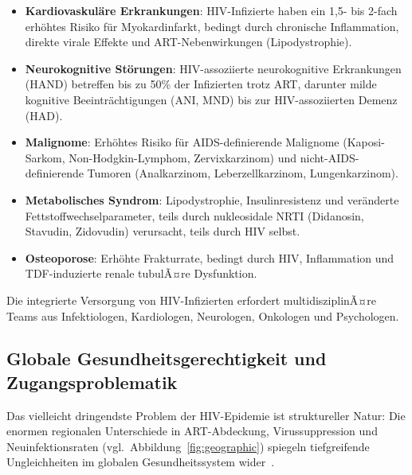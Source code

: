 ﻿\documentclass[a4paper,12pt]{article}
\theoremstyle{definition}
\begin{document}
\begin{itemize}
\item \textbf{Kardiovaskul\"are Erkrankungen}: HIV-Infizierte haben ein 1{,}5- bis
      2-fach erh\"ohtes Risiko f\"ur Myokardinfarkt, bedingt durch chronische
      Inflammation, direkte virale Effekte und ART-Nebenwirkungen (Lipodystrophie).

\item \textbf{Neurokognitive St\"orungen}: HIV-assoziierte neurokognitive Erkrankungen
      (HAND) betreffen bis zu 50\% der Infizierten trotz ART, darunter milde
      kognitive Beeintr\"achtigungen (ANI, MND) bis zur HIV-assoziierten Demenz (HAD).

\item \textbf{Malignome}: Erh\"ohtes Risiko f\"ur AIDS-definierende Malignome
      (Kaposi-Sarkom, Non-Hodgkin-Lymphom, Zervixkarzinom) und nicht-AIDS-definierende
      Tumoren (Analkarzinom, Leberzellkarzinom, Lungenkarzinom).

\item \textbf{Metabolisches Syndrom}: Lipodystrophie, Insulinresistenz und
      ver\"anderte Fettstoffwechselparameter, teils durch nukleosidale NRTI
      (Didanosin, Stavudin, Zidovudin) verursacht, teils durch HIV selbst.

\item \textbf{Osteoporose}: Erh\"ohte Frakturrate, bedingt durch HIV,
      Inflammation und TDF-induzierte renale tubulÃ¤re Dysfunktion.
\end{itemize}

Die integrierte Versorgung von HIV-Infizierten erfordert multidisziplinÃ¤re Teams
aus Infektiologen, Kardiologen, Neurologen, Onkologen und Psychologen.

\subsection{Globale Gesundheitsgerechtigkeit und Zugangsproblematik}

Das vielleicht dringendste Problem der HIV-Epidemie ist struktureller Natur:
Die enormen regionalen Unterschiede in ART-Abdeckung, Virussuppression und
Neuinfektionsraten (vgl.\ Abbildung~\ref{fig:geographic}) spiegeln tiefgreifende
Ungleichheiten im globalen Gesundheitssystem wider~\cite{bekker2023hiv}.
\end{document}
